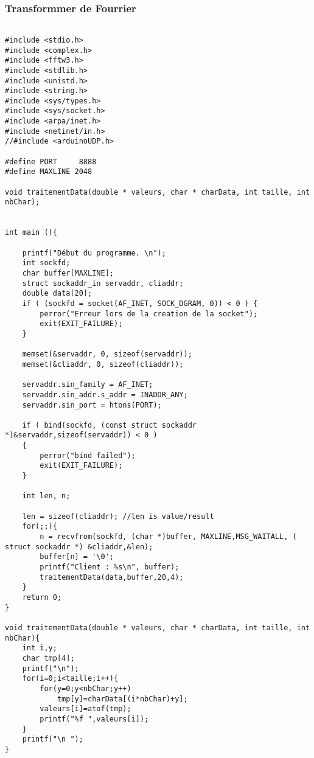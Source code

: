 \subsubsection*{Transformmer de Fourrier}
\begin{scriptsize}
\begin{lstlisting}

#include <stdio.h>
#include <complex.h>
#include <fftw3.h>
#include <stdlib.h>
#include <unistd.h>
#include <string.h>
#include <sys/types.h>
#include <sys/socket.h>
#include <arpa/inet.h>
#include <netinet/in.h>
//#include <arduinoUDP.h>

#define PORT	 8888
#define MAXLINE 2048

void traitementData(double * valeurs, char * charData, int taille, int nbChar);


int main (){

	printf("Début du programme. \n");
	int sockfd;
	char buffer[MAXLINE];
	struct sockaddr_in servaddr, cliaddr;
	double data[20];
	if ( (sockfd = socket(AF_INET, SOCK_DGRAM, 0)) < 0 ) {
		perror("Erreur lors de la creation de la socket");
		exit(EXIT_FAILURE);
	}

	memset(&servaddr, 0, sizeof(servaddr));
	memset(&cliaddr, 0, sizeof(cliaddr));

	servaddr.sin_family = AF_INET; 
	servaddr.sin_addr.s_addr = INADDR_ANY;
	servaddr.sin_port = htons(PORT);

	if ( bind(sockfd, (const struct sockaddr *)&servaddr,sizeof(servaddr)) < 0 )
	{
		perror("bind failed");
		exit(EXIT_FAILURE);
	}

	int len, n;

	len = sizeof(cliaddr); //len is value/result
	for(;;){
		n = recvfrom(sockfd, (char *)buffer, MAXLINE,MSG_WAITALL, ( struct sockaddr *) &cliaddr,&len);
		buffer[n] = '\0';
		printf("Client : %s\n", buffer);
		traitementData(data,buffer,20,4);
	}
	return 0;
}

void traitementData(double * valeurs, char * charData, int taille, int nbChar){
	int i,y;
	char tmp[4];
	printf("\n");
	for(i=0;i<taille;i++){
		for(y=0;y<nbChar;y++)
			tmp[y]=charData[(i*nbChar)+y];
		valeurs[i]=atof(tmp);
		printf("%f ",valeurs[i]);
	}
	printf("\n ");
}
\end{lstlisting}
\end{scriptsize} 

